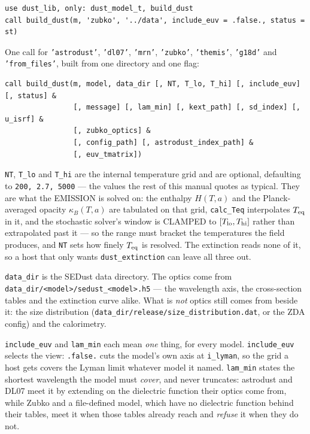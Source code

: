 \documentclass{my_memo}
\newcommand{\code}[1]{\texttt{#1}}
\begin{document}
\begin{lstlisting}
use dust_lib, only: dust_model_t, build_dust
call build_dust(m, 'zubko', '../data', include_euv = .false., status = st)
\end{lstlisting}

\noindent One call for \code{'astrodust'}, \code{'dl07'}, \code{'mrn'},
\code{'zubko'}, \code{'themis'}, \code{'g18d'} and \code{'from\_files'}, built
from one directory and one flag:

\begin{lstlisting}
call build_dust(m, model, data_dir [, NT, T_lo, T_hi] [, include_euv] [, status] &
                [, message] [, lam_min] [, kext_path] [, sd_index] [, u_isrf] &
                [, zubko_optics] &
                [, config_path] [, astrodust_index_path] &
                [, euv_tmatrix])
\end{lstlisting}

\code{NT}, \code{T\_lo} and \code{T\_hi} are the internal temperature grid
and are optional, defaulting to \code{200, 2.7, 5000} --- the values the rest of
this manual quotes as typical. They are what the EMISSION is solved on: the
enthalpy $H(T,a)$ and the Planck-averaged opacity $\kappa_B(T,a)$ are tabulated
on that grid, \code{calc\_Teq} interpolates $T_{\rm eq}$ in it, and the
stochastic solver's window is CLAMPED to $[T_{\rm lo}, T_{\rm hi}]$ rather than
extrapolated past it --- so the range must bracket the temperatures the field
produces, and \code{NT} sets how finely $T_{\rm eq}$ is resolved. The extinction
reads none of it, so a host that only wants \code{dust\_extinction} can leave
all three out.

\code{data\_dir} is the SEDust data directory. The optics come from
\code{data\_dir/<model>/sedust\_<model>.h5} --- the wavelength axis, the cross-section
tables and the extinction curve alike. What is \emph{not} optics still comes
from beside it: the size distribution
(\code{data\_dir/release/size\_distribution.dat}, or the ZDA config) and the
calorimetry.

\code{include\_euv} and \code{lam\_min} each mean \emph{one} thing, for every
model. \code{include\_euv} selects the view: \code{.false.} cuts the model's own
axis at \code{i\_lyman}, so the grid a host gets covers the Lyman limit whatever
model it named. \code{lam\_min} states the shortest wavelength the model must
\emph{cover}, and never truncates: astrodust and DL07 meet it by extending on
the dielectric function their optics come from, while Zubko and a file-defined
model, which have no dielectric function behind their tables, meet it when
those tables already reach and \emph{refuse} it when they do not.
\end{document}
